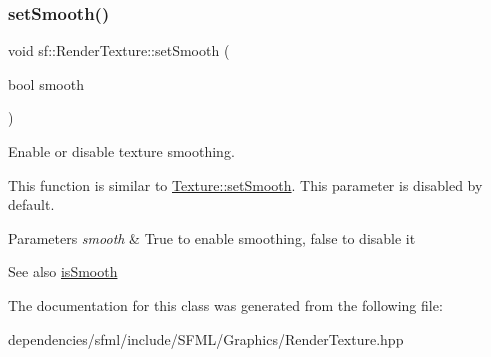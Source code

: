 \subsubsection{\texorpdfstring{set\+Smooth()}{setSmooth()}}
{\footnotesize\ttfamily void sf\+::\+Render\+Texture\+::set\+Smooth (\begin{DoxyParamCaption}\item[{bool}]{smooth }\end{DoxyParamCaption})}



Enable or disable texture smoothing. 

This function is similar to \hyperlink{classsf_1_1_texture_a0c3bd6825b9a99714f10d44179d74324}{Texture\+::set\+Smooth}. This parameter is disabled by default.


\begin{DoxyParams}{Parameters}
{\em smooth} & True to enable smoothing, false to disable it\\
\hline
\end{DoxyParams}
\begin{DoxySeeAlso}{See also}
\hyperlink{classsf_1_1_render_texture_a5b43c007ab6643accc5dae84b5bc8f61}{is\+Smooth} 
\end{DoxySeeAlso}


The documentation for this class was generated from the following file\+:\begin{DoxyCompactItemize}
\item 
dependencies/sfml/include/\+S\+F\+M\+L/\+Graphics/Render\+Texture.\+hpp\end{DoxyCompactItemize}
